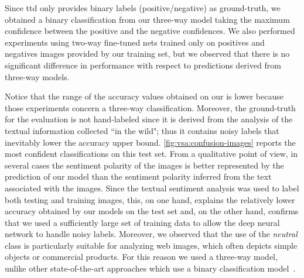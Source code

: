 Since \gls{ttd} only provides binary labels (positive/negative) as ground-truth, we obtained a binary classification from our three-way model taking the maximum confidence between the positive and the negative confidences.
We also performed experiments using two-way fine-tuned nets trained only on positives and negatives images provided by our training set, but we observed that there is no significant difference in performance with respect to predictions derived from three-way models.

Notice that the range of the accuracy values obtained on our \BTSA{} is lower because those experiments concern a three-way classification.
Moreover, the ground-truth for the evaluation is not hand-labeled since it is derived from the analysis of the textual information collected ``in the wild";
thus it contains noisy labels that inevitably lower the accuracy upper bound. %
\ref{fig:vsa:confusion-images} reports the most confident classifications on this test set.
From a qualitative point of view, in several cases the sentiment polarity of the images is better represented by the prediction of our model than the sentiment polarity inferred from the text associated with the images.
Since the textual sentiment analysis was used to label both testing and training images, this, on one hand, explains the relatively lower accuracy obtained by our models on the \BTSA{} test set and, on the other hand, confirms that we used a sufficiently large set of training data to allow the deep neural network to handle noisy labels.
Moreover, we observed that the use of the \emph{neutral} class is particularly suitable for analyzing web images, which often depicts simple objects or commercial products.
For this reason we used a three-way model, unlike other state-of-the-art approaches which use a binary classification model~\cite{campos2017pixels,islam2016visual,you2015robust}.


